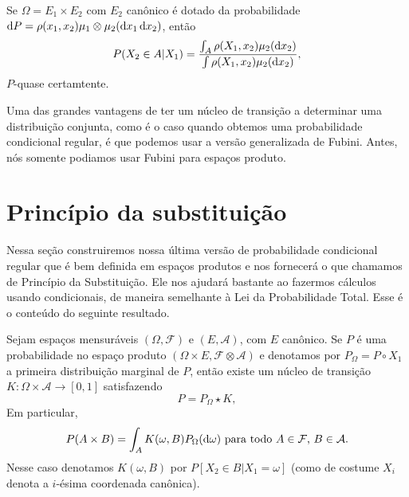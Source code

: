 \begin{exercise}
  Se $\Omega = E_1 \times E_2$ com $E_2$ canônico é dotado da probabilidade $\mathop{}\!\mathrm{d} P = \rho(x_1, x_2) \mu_1 \otimes \mu_2 (\mathop{}\!\mathrm{d} x_1 \mathop{}\!\mathrm{d} x_2)$, então
  \begin{equation}
    P(X_2 \in A|X_1) = \frac{\int_A \rho(X_1, x_2) \mu_2(\mathop{}\!\mathrm{d} x_2)}{\int \rho(X_1, x_2) \mu_2(\mathop{}\!\mathrm{d} x_2)},
  \end{equation}
  $P$-quase certamtente.
\end{exercise}

Uma das grandes vantagens de ter um núcleo de transição a determinar uma distribuição conjunta, como é o caso quando obtemos uma probabilidade condicional regular, é que podemos usar a versão generalizada de Fubini.
Antes, nós somente podiamos usar Fubini para espaços produto.

\newpage

\section{Princípio da substituição}

Nessa seção construiremos nossa última versão de probabilidade condicional regular que é bem definida em espaços produtos e nos fornecerá o que chamamos de Princípio da Substituição. 
Ele nos ajudará bastante ao fazermos cálculos usando condicionais, de maneira semelhante à Lei da Probabilidade Total.
Esse é o conteúdo do seguinte resultado.

\begin{theorem}
  \label{t:prob_cond_reg_prod}
  Sejam espaços mensuráveis $(\Omega, \mathcal{F})$ e $(E, \mathcal{A})$, com $E$ canônico.
  Se $P$ é uma probabilidade no espaço produto $(\Omega \times E, \mathcal{F} \otimes \mathcal{A})$ e denotamos por $P_\Omega = P \circ X_1$ a primeira distribuição marginal de $P$, então existe um núcleo de transição $K: \Omega \times \mathcal{A} \to [0,1]$ satisfazendo
  \begin{equation}
    P = P_\Omega \star K,
  \end{equation}
  Em particular,
  \begin{equation}
    \label{e:prob_cond_reg_prod}
    P(A \times B) = \int_A K(\omega, B) P_\Omega (\mathop{}\!\mathrm{d} \omega) \text{ para todo $A \in \mathcal{F}$, $B \in \mathcal{A}$}.
  \end{equation}
  Nesse caso denotamos $K(\omega, B)$ por $P[X_2 \in B | X_1 = \omega]$ (como de costume $X_i$ denota a $i$-ésima coordenada canônica).
\end{theorem}

